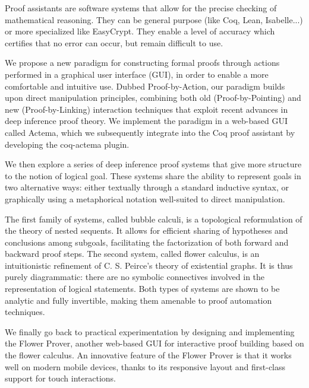 Proof assistants are software systems that allow for the precise checking of
mathematical reasoning. They can be general purpose (like Coq, Lean,
Isabelle...) or more specialized like EasyCrypt. They enable a level of accuracy
which certifies that no error can occur, but remain difficult to use.

We propose a new paradigm for constructing formal proofs through actions
performed in a graphical user interface (GUI), in order to enable a more
comfortable and intuitive use. Dubbed Proof-by-Action, our paradigm builds upon
direct manipulation principles, combining both old (Proof-by-Pointing) and new
(Proof-by-Linking) interaction techniques that exploit recent advances in deep
inference proof theory. We implement the paradigm in a web-based GUI called
Actema, which we subsequently integrate into the Coq proof assistant by
developing the coq-actema plugin.

We then explore a series of deep inference proof systems that give more
structure to the notion of logical goal. These systems share the ability to
represent goals in two alternative ways: either textually through a standard
inductive syntax, or graphically using a metaphorical notation well-suited
to direct manipulation.

The first family of systems, called bubble calculi, is a topological
reformulation of the theory of nested sequents. It allows for efficient sharing
of hypotheses and conclusions among subgoals, facilitating the factorization of
both forward and backward proof steps. The second system, called flower
calculus, is an intuitionistic refinement of C. S. Peirce's theory of
existential graphs. It is thus purely diagrammatic: there are no symbolic
connectives involved in the representation of logical statements. Both types of
systems are shown to be analytic and fully invertible, making them amenable to
proof automation techniques.

We finally go back to practical experimentation by designing and implementing
the Flower Prover, another web-based GUI for interactive proof building based on
the flower calculus. An innovative feature of the Flower Prover is that it works
well on modern mobile devices, thanks to its responsive layout and first-class
support for touch interactions.